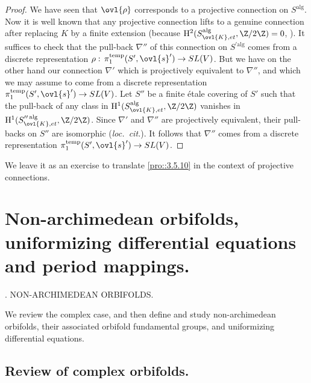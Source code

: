 \begin{proof}
 We have seen that $\ovl{\rho}$ corresponds to a projective connection on
 $S^{\mathrm{alg}}$. Now it is well known that any projective connection
 lifts to a genuine connection after replacing $K$ by a finite extension
 (because $\mathrm{H}^2(S^{\mathrm{alg}}_{\ovl{K}, et},
 \Z/2\Z)=0$, \cf \cite[2.2.2.1]{katz90:_expon}). It suffices to check that the
 pull-back $\nabla''$ of this connection on $S^{\prime \mathrm{alg}}$
 comes from a discrete representation
 $\rho:\,\pi_1^{\mathrm{temp}}(S',\ovl{s}')\to SL(V)$. But we have on the
 other hand our connection $\nabla'$ which is projectively equivalent to
 $\nabla''$, 
 and which we may assume to come from a discrete representation 
 $\pi_1^{\mathrm{temp}}(S',\ovl{s}')\to SL(V)$. Let $S''$ be a finite
 \'etale covering of $S'$ such that the pull-back of any class in
 $\mathrm{H}^1(S^{\mathrm{alg}}_{\ovl{K}, 
 et}, \Z/2\Z)$ vanishes in $\mathrm{H}^1(S^{\prime \prime\,
 \mathrm{alg}}_{\ovl{K}, et}, 
 \Z/2\Z)$. Since $\nabla'$ and $\nabla''$ are projectively equivalent,
 their pull-backs on $S''$ are isomorphic 
 ({\it loc.~cit.}). It follows that $\nabla''$ comes from a discrete
 representation $\pi_1^{\mathrm{temp}}(S',\ovl{s}')\to SL(V)$.        
\end{proof}

\medskip We leave it as an exercise to translate \ref{pro::3.5.10} in
the context of projective connections.

 
\newpage
\section{Non-archimedean orbifolds, uniformizing differential equations
and period mappings.}\label{sec::4}

%
{\thesection. NON-ARCHIMEDEAN ORBIFOLDS.}

\begin{abst}
We review the complex case, and then define and study non-archimedean
orbifolds, their associated orbifold fundamental groups, and
uniformizing differential equations.
\end{abst}


\subsection{Review of complex orbifolds.}\label{sub::4.1}

